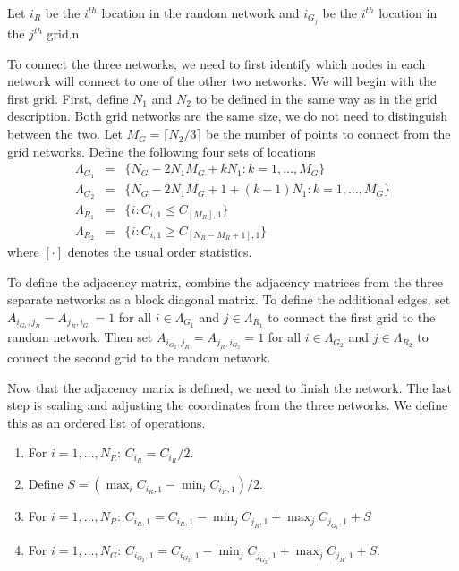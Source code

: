 \documentclass[11pt]{article}
\begin{document}
Let $i_{R}$ be the $i^{th}$ location in the random network and
$i_{G_j}$ be the $i^{th}$ location in the $j^{th}$ grid.n

To connect the three networks, we need to first identify which nodes
in each network will connect to one of the other two networks.  We
will begin with the first grid.  First, define $N_1$ and $N_2$ to be
defined in the same way as in the grid description.  Both grid
networks are the same size, we do not need to distinguish between the
two.  Let $M_{G} = \lceil N_2/3 \rceil$ be the number of points to
connect from the grid networks.  Define the following four sets of locations
\begin{equation*}
  \begin{array}{rcl}
    \Lambda_{G_1} & = & \lbrace N_G -
                        2N_1M_G + kN_1 : k = 1,\ldots,M_G\rbrace\\
    \Lambda_{G_2} & = & \lbrace N_G -
                        2N_1M_G + 1 + (k-1)N_1 : k =
                        1,\ldots,M_G\rbrace\\
    \Lambda_{R_1} & = & \lbrace i : C_{i,1} \le C_{[M_R],1} \rbrace\\
    \Lambda_{R_2} & = & \lbrace i : C_{i,1} \ge C_{[N_R - M_R + 1],1} \rbrace
  \end{array}
\end{equation*}
where $[\cdot]$ denotes the usual order statistics.

To define the adjacency matrix, combine the adjacency matrices from
the three separate networks as a block diagonal matrix.  To define the
additional edges, set $A_{i_{G_1},j_R} = A_{j_R,i_{G_1}} = 1$ for all
$i \in \Lambda_{G_1}$ and $j \in \Lambda_{R_1}$ to connect the first
grid to the random network.  Then set $A_{i_{G_2},j_R} =
A_{j_R,i_{G_2}} = 1$ for all $i \in \Lambda_{G_2}$ and $j \in
\Lambda_{R_2}$ to connect the second grid to the random network.

Now that the adjacency marix is defined, we need to finish the
network.  The last step is scaling and adjusting the coordinates from
the three networks.  We define this as an ordered list of operations.
\begin{enumerate}
  \item For $i=1,\ldots,N_R$: $C_{i_{R}} = C_{i_{R}}/2$.
  \item Define $S = (\max_i C_{i_{R},1} - \min_i C_{i_{R},1})/2$.
  \item For $i=1,\ldots,N_R$: $C_{i_{R},1} = C_{i_{R},1} -
  \min_j C_{j_{R},1} + \max_j C_{j_{G_1},1} + S$
  \item For $i=1,\ldots,N_G$:
  $C_{i_{G_2},1} = C_{i_{G_2},1} - \min_j C_{j_{G_2},1} + \max_j
  C_{j_{R},1} + S$.
\end{enumerate}
\end{document}
